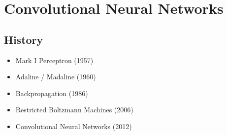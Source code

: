 \section{Convolutional Neural Networks}
\subsection{History}
\begin{itemize}
	\item Mark I Perceptron (1957)
	\item Adaline / Madaline (1960)
	\item Backpropagation (1986)
	\item Restricted Boltzmann Machines (2006)
	\item Convolutional Neural Networks (2012)
\end{itemize}

